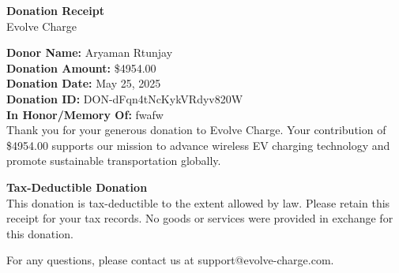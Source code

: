 \documentclass[a4paper,12pt]{article}
\begin{document}
\begin{center}
{\Large \textbf{Donation Receipt}}\\
\vspace{0.5cm}
Evolve Charge
\end{center}

\vspace{0.5cm}

\noindent
{\bf Donor Name:} Aryaman Rtunjay\\
{\bf Donation Amount:} \$4954.00\\
{\bf Donation Date:} May 25, 2025\\
{\bf Donation ID:} DON-dFqn4tNcKykVRdyv820W\\
\noindent
{\bf In Honor/Memory Of:} fwafw\\

\vspace{0.5cm}
\noindent
Thank you for your generous donation to Evolve Charge. Your contribution of \$4954.00 supports our mission to advance wireless EV charging technology and promote sustainable transportation globally.

\vspace{0.5cm}

\noindent
{\bf Tax-Deductible Donation}\\
This donation is tax-deductible to the extent allowed by law. Please retain this receipt for your tax records. No goods or services were provided in exchange for this donation.

\vspace{0.5cm}

\noindent
For any questions, please contact us at support@evolve-charge.com.
\end{document}
